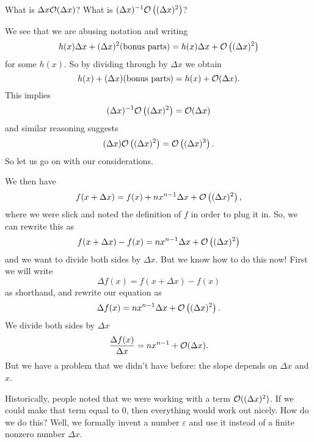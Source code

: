 \begin{problem}
What is $\Delta x\mathcal{O}(\Delta x)$? What is $(\Delta
x)^{-1}\mathcal{O}\left((\Delta x)^{2}\right)$?
\end{problem}

We see that we are abusing notation and writing
\begin{equation}
h(x)\Delta x+(\Delta x)^{2}(\mbox{bonus parts})=h(x)\Delta x+\mathcal{O}\left((\Delta x)^{2}\right)
\end{equation}
for some $h(x)$. So by dividing through by $\Delta x$ we obtain
\begin{equation}
h(x)+(\Delta x)(\mbox{bonus parts})=h(x)+\mathcal{O}(\Delta x).
\end{equation}
This implies
\begin{equation}
(\Delta x)^{-1}\mathcal{O}\left((\Delta x)^{2}\right)=\mathcal{O}(\Delta x)
\end{equation}
and similar reasoning suggests
\begin{equation}
(\Delta x)\mathcal{O}\left((\Delta x)^{2}\right)=\mathcal{O}\left((\Delta x)^{3}\right).
\end{equation}
So let us go on with our considerations.

We then have
\begin{equation}
f(x+\Delta x)=f(x)+nx^{n-1}\Delta x+\mathcal{O}\left((\Delta x)^{2}\right),
\end{equation}
where we were slick and noted the definition of $f$ in order to
plug it in. So, we can rewrite this as
\begin{equation}
f(x+\Delta x)-f(x)=nx^{n-1}\Delta x+\mathcal{O}\left((\Delta x)^{2}\right)
\end{equation}
and we want to divide both sides by $\Delta x$. But we know how
to do this now! First we will write
\begin{equation}
\Delta f(x)=f(x+\Delta x)-f(x)
\end{equation}
as shorthand, and rewrite our equation as
\begin{equation}
\Delta f(x)=nx^{n-1}\Delta x+\mathcal{O}\left((\Delta x)^{2}\right).
\end{equation}
We divide both sides by $\Delta x$
\begin{equation}
\frac{\Delta f(x)}{\Delta x}=nx^{n-1}+\mathcal{O}(\Delta x).
\end{equation}
But we have a problem that we didn't have before: the slope
depends on $\Delta x$ and $x$.

Historically, people noted that we were working with a term
$\mathcal{O}((\Delta x)^{2})$. If we could make that term equal to 0,
then everything would work out nicely. How do we do this? Well,
we formally invent a number $\varepsilon$ and use it instead of a
finite nonzero number $\Delta x$.

